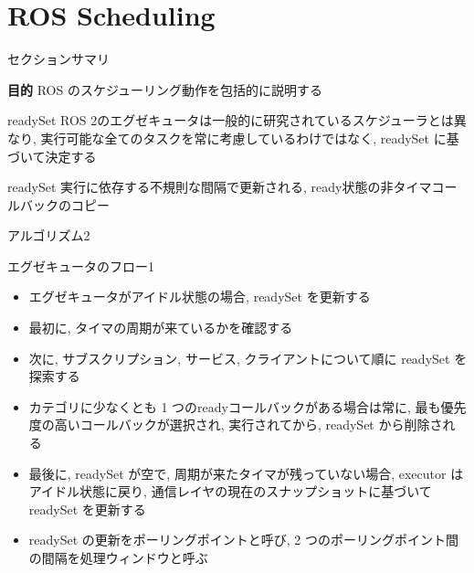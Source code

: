 
\section{ROS Scheduling}
\label{sec: ros scheduling}


\begin{frame}{セクションサマリ}
    \begin{itembox}[l]{\textbf{目的}}
        ROS のスケジューリング動作を包括的に説明する
    \end{itembox}
\end{frame}



\begin{frame}{readySet}
    ROS 2のエグゼキュータは一般的に研究されているスケジューラとは異なり, 実行可能な全てのタスクを常に考慮しているわけではなく, readySet に基づいて決定する
    \begin{block}{readySet}
        実行に依存する不規則な間隔で更新される, ready状態の非タイマコールバックのコピー
    \end{block}
\end{frame}

\begin{frame}{アルゴリズム2}
\end{frame}

\begin{frame}{エグゼキュータのフロー1}
    \begin{itemize}
        \item エグゼキュータがアイドル状態の場合, readySet を更新する
        \item 最初に, タイマの周期が来ているかを確認する
        \item 次に, サブスクリプション, サービス, クライアントについて順に readySet を探索する
    \end{itemize}
\end{frame}

\begin{frame}{}
    \begin{itemize}
        \item カテゴリに少なくとも 1 つのreadyコールバックがある場合は常に, 最も優先度の高いコールバックが選択され, 実行されてから, readySet から削除される
        \item 最後に, readySet が空で, 周期が来たタイマが残っていない場合, executor はアイドル状態に戻り, 通信レイヤの現在のスナップショットに基づいて readySet を更新する
        \item readySet の更新をポーリングポイントと呼び, 2 つのポーリングポイント間の間隔を処理ウィンドウと呼ぶ
    \end{itemize}
\end{frame}

